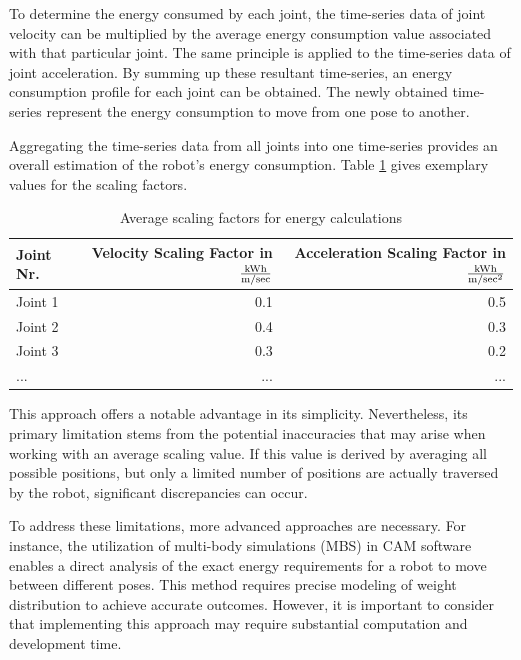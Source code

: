 To determine the energy consumed by each joint, the time-series data of joint velocity can be multiplied by the average energy consumption value associated with that particular joint. The same principle is applied to the time-series data of joint acceleration. By summing up these resultant time-series, an energy consumption profile for each joint can be obtained. The newly obtained time-series represent the energy consumption to move from one pose to another.

Aggregating the time-series data from all joints into one time-series provides an overall estimation of the robot's energy consumption. Table \ref{scalers} gives exemplary values for the scaling factors.\newline


\begin{table}[H]
	\centering
	\begin{tabular}{||l|r|r||}
		Joint Nr.  & Velocity Scaling Factor in \(\frac{\si[per-mode=symbol]{\kWh}}{\si[per-mode=symbol]{\m\per\sec }}\)& Acceleration Scaling Factor in \(\frac{\si[per-mode=symbol]{\kWh}}{\si[per-mode=symbol]{\m\per\sec\squared }}\) \\
		\hline
		\hline
		\hline
		Joint 1	& 0.1 & 0.5\\
		Joint 2	&  0.4& 0.3 \\
		Joint 3	& 0.3& 0.2\\
		...& ...& ...\\
		
		\hline
		\hline
	\end{tabular}
	
	\caption{Average scaling factors for energy calculations}
	\label{scalers}
\end{table}


This approach offers a notable advantage in its simplicity. Nevertheless, its primary limitation stems from the potential inaccuracies that may arise when working with an average scaling value. If this value is derived by averaging all possible positions, but only a limited number of positions are actually traversed by the robot, significant discrepancies can occur.


To address these limitations, more advanced approaches are necessary. For instance, the utilization of multi-body simulations (MBS) in CAM software enables a direct analysis of the exact energy requirements for a robot to move between different poses. This method requires precise modeling of weight distribution to achieve accurate outcomes. However, it is important to consider that implementing this approach may require substantial computation and development time.


